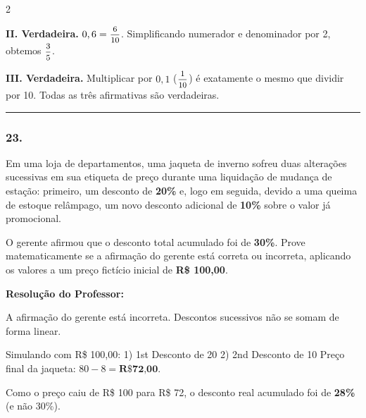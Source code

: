\begin{multicols*}{2}
\begin{tcolorbox}[colback=CorTitUm!5, colframe=CorTitUm, boxrule=1pt, arc=4pt, left=6pt, right=6pt, top=6pt, bottom=6pt]
    \textbf{II. Verdadeira.} $0,6 = \mfrac{6}{10}$. Simplificando numerador e denominador por 2, obtemos $\mfrac{3}{5}$.
    
    \textbf{III. Verdadeira.} Multiplicar por $0,1$ ($\mfrac{1}{10}$) é exatamente o mesmo que dividir por 10. Todas as três afirmativas são verdadeiras.
    \end{tcolorbox}
\fi

\par\vspace{\espacoQuestao}

\noindent\textcolor{CorLinha}{\rule{\linewidth}{0.5pt}} 
\par\vspace{\espacoPreQuestao}
\subsubsection*{23.} Em uma loja de departamentos, uma jaqueta de inverno sofreu duas alterações sucessivas em sua etiqueta de preço durante uma liquidação de mudança de estação: primeiro, um desconto de \textbf{20\%} e, logo em seguida, devido a uma queima de estoque relâmpago, um novo desconto adicional de \textbf{10\%} sobre o valor já promocional.

O gerente afirmou que o desconto total acumulado foi de \textbf{30\%}. Prove matematicamente se a afirmação do gerente está correta ou incorreta, aplicando os valores a um preço fictício inicial de \textbf{R\$ 100,00}.

\ifgabarito
    \begin{tcolorbox}[colback=CorTitUm!5, colframe=CorTitUm, boxrule=1pt, arc=4pt, left=6pt, right=6pt, top=6pt, bottom=6pt]
    \small\textbf{\textcolor{CorTitUm}{Resolução do Professor:}}\par\vspace{0.1cm}
    \color{CinzaEscuro}
    A afirmação do gerente está incorreta. Descontos sucessivos não se somam de forma linear.
    
    Simulando com R\$ 100,00:
    1) 1st Desconto de 20%
    2) 2nd Desconto de 10%
    Preço final da jaqueta: $80 - 8 = \textbf{R\$ 72,00}$.
    
    Como o preço caiu de R\$ 100 para R\$ 72, o desconto real acumulado foi de \textbf{28\%} (e não 30\%).
    \end{tcolorbox}
\fi

\par\vspace{\espacoQuestao}


\end{multicols*}
